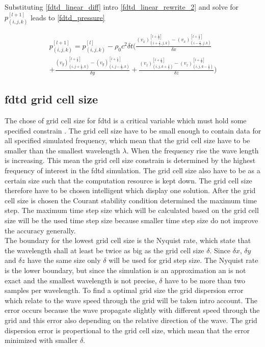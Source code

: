 Substituting \autoref{fdtd_linear_diff} intro \autoref{fdtd_linear_rewrite_2} and solve for $p_{(i,j,k)}^{[l+1]}$ leads to  \autoref{fdtd_pressure}




\begin{multline}\label{fdtd_pressure}
p_{(i,j,k)}^{[l+1]} = p_{(i,j,k)}^{[l]} - \rho_0 c^2 \delta t \Biggl( \frac{(v_x)_{(i+\frac{1}{2},j,k)}^{[l+\frac{1}{2}]} - (v_x)_{(i-\frac{1}{2},j,k)}^{[l+\frac{1}{2}]}}{\delta x} \\ 
+ \frac{(v_y)_{(i,j+\frac{1}{2},k)}^{[l+\frac{1}{2}]}-(v_y)_{(i,j-\frac{1}{2},k)}^{[l+\frac{1}{2}]}}{\delta y} +  \frac{(v_z)_{(i,j,k+\frac{1}{2})}^{[l+\frac{1}{2}]}-(v_z)_{(i,j,k-\frac{1}{2})}^{[l+\frac{1}{2}]}}{\delta z} \Biggr)
\end{multline}




\subsection{\gls{fdtd} grid cell size}

The chose of grid cell size for \gls{fdtd} is a critical variable which must hold some specified constrain \citep{Kunz1993}. The grid cell size have to be small enough to contain data for all specified simulated frequency, which mean that the grid cell size have to be smaller than the smallest wavelength $\lambda$. When the frequency rise the wave length is increasing. This mean the grid cell size constrain is determined by the highest frequency of interest in the \gls{fdtd} simulation. The grid cell size also have to be as a certain size such that the computation resource is kept down. The grid cell size therefore have to be chosen intelligent which \citep{Kunz1993} display one solution. After the grid cell size is chosen the Courant stability condition determined the maximum time step. The maximum time step size which will be calculated based on the grid cell size will be the used time step size because smaller time step size do not improve the accuracy generally. \\


The boundary for the lowest grid cell size is the Nyquist rate, which state that the wavelength shall at least be twice as big as the grid cell size $\delta$. Since $\delta x$, $\delta y$ and $\delta z$ have the same size only $\delta$ will be used for grid step size. The Nyquist rate is the lower boundary, but since the simulation is an approximation an is not exact and the smallest wavelength is not precise, $\delta$ have to be more than two samples per wavelength. To find a optimal grid size the grid dispersion error which relate to the wave speed through the grid will be taken intro account. The error occurs because the wave propagate slightly with different speed through the grid and this error also depending on the relative direction of the wave. The grid dispersion error is propertional to the grid cell size, which mean that the error minimized with smaller $\delta$\citep{Kunz1993}. 

